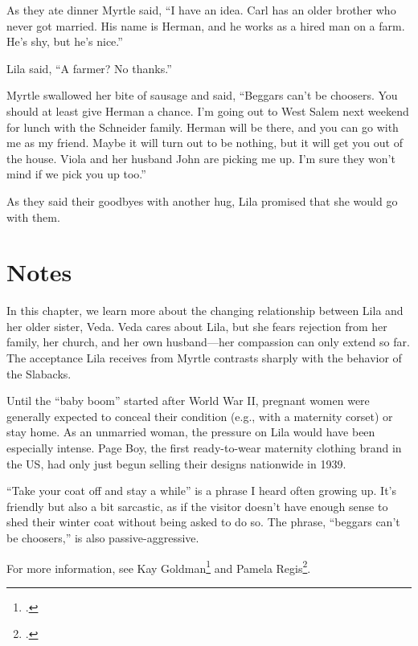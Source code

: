 \documentclass[
  letterpaper,
]{book}
\begin{document}
As they ate dinner Myrtle said, ``I have an idea. Carl has an older
brother who never got married. His name is Herman, and he works as a
hired man on a farm. He's shy, but he's nice.''

Lila said, ``A farmer? No thanks.''

Myrtle swallowed her bite of sausage and said, ``Beggars can't be
choosers. You should at least give Herman a chance. I'm going out to
West Salem next weekend for lunch with the Schneider family. Herman will
be there, and you can go with me as my friend. Maybe it will turn out to
be nothing, but it will get you out of the house. Viola and her husband
John are picking me up. I'm sure they won't mind if we pick you up
too.''

As they said their goodbyes with another hug, Lila promised that she
would go with them.

\section{Notes}\label{notes-33}

In this chapter, we learn more about the changing relationship between
Lila and her older sister, Veda. Veda cares about Lila, but she fears
rejection from her family, her church, and her own husband---her
compassion can only extend so far. The acceptance Lila receives from
Myrtle contrasts sharply with the behavior of the Slabacks.

Until the ``baby boom'' started after World War II, pregnant women were
generally expected to conceal their condition (e.g., with a maternity
corset) or stay home. As an unmarried woman, the pressure on Lila would
have been especially intense. Page Boy, the first ready-to-wear
maternity clothing brand in the US, had only just begun selling their
designs nationwide in 1939.

``Take your coat off and stay a while'' is a phrase I heard often
growing up. It's friendly but also a bit sarcastic, as if the visitor
doesn't have enough sense to shed their winter coat without being asked
to do so. The phrase, ``beggars can't be choosers,'' is also
passive-aggressive.

For more information, see Kay Goldman\footnote{.} and Pamela
Regis\footnote{.}.
\end{document}
